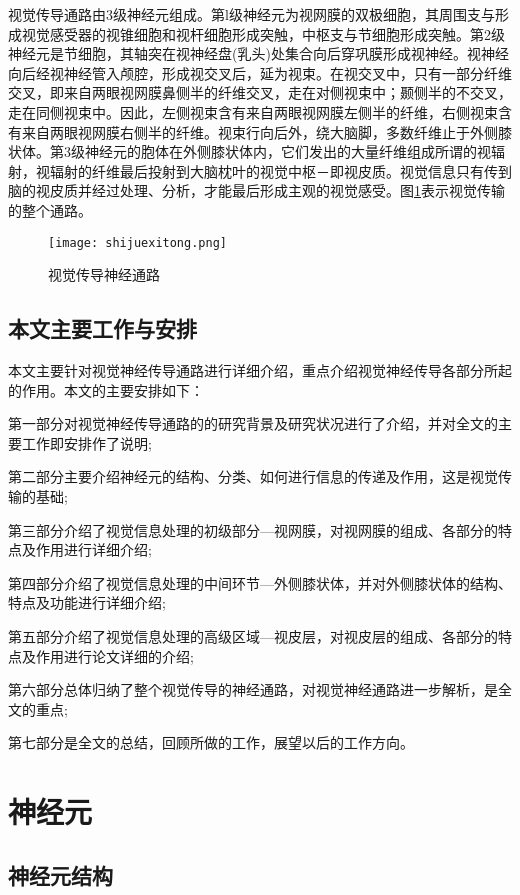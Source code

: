 \documentclass[a4paper,12pt]{article}
\begin{document}
视觉传导通路由3级神经元组成\cite{4:misc}。第l级神经元为视网膜的双极细胞，其周围支与形成视觉感受器的视锥细胞和视杆细胞形成突触，中枢支与节细胞形成突触。第2级神经元是节细胞，其轴突在视神经盘(乳头)处集合向后穿巩膜形成视神经。视神经向后经视神经管入颅腔，形成视交叉后，延为视束。在视交叉中，只有一部分纤维交叉，即来自两眼视网膜鼻侧半的纤维交叉，走在对侧视束中；颞侧半的不交叉，走在同侧视束中。因此，左侧视束含有来自两眼视网膜左侧半的纤维，右侧视束含有来自两眼视网膜右侧半的纤维。视束行向后外，绕大脑脚，多数纤维止于外侧膝状体。第3级神经元的胞体在外侧膝状体内，它们发出的大量纤维组成所谓的视辐射，视辐射的纤维最后投射到大脑枕叶的视觉中枢－即视皮质。视觉信息只有传到脑的视皮质并经过处理、分析，才能最后形成主观的视觉感受。图\ref{fig 1}表示视觉传输的整个通路。


\begin{figure}[!htb]
\centering
\texttt{[image: shijuexitong.png]}
\caption{视觉传导神经通路}\label{fig 1} 
\end{figure}


\subsection{本文主要工作与安排}

本文主要针对视觉神经传导通路进行详细介绍，重点介绍视觉神经传导各部分所起的作用。本文的主要安排如下：


第一部分对视觉神经传导通路的的研究背景及研究状况进行了介绍，并对全文的主要工作即安排作了说明;


第二部分主要介绍神经元的结构、分类、如何进行信息的传递及作用，这是视觉传输的基础;


第三部分介绍了视觉信息处理的初级部分---视网膜，对视网膜的组成、各部分的特点及作用进行详细介绍;


第四部分介绍了视觉信息处理的中间环节---外侧膝状体，并对外侧膝状体的结构、特点及功能进行详细介绍;


第五部分介绍了视觉信息处理的高级区域---视皮层，对视皮层的组成、各部分的特点及作用进行论文详细的介绍;


第六部分总体归纳了整个视觉传导的神经通路，对视觉神经通路进一步解析，是全文的重点;


第七部分是全文的总结，回顾所做的工作，展望以后的工作方向。

\section{神经元} 

\subsection{神经元结构}
\end{document}

